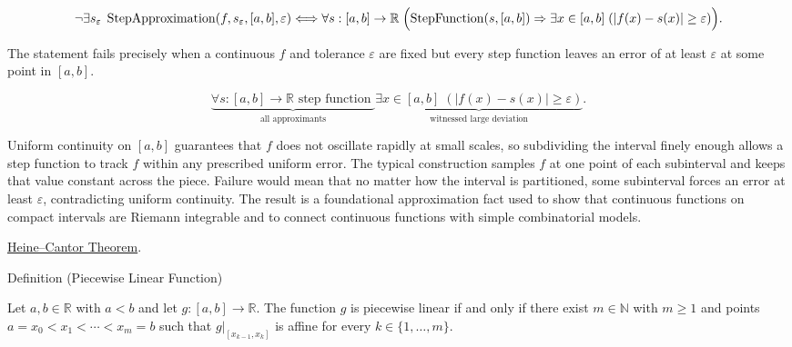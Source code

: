 \begin{remark*}
\[
\neg\exists s_\varepsilon\;
\operatorname{StepApproximation}(f,s_\varepsilon,[a,b],\varepsilon)
\Longleftrightarrow
\forall s:[a,b]\to\mathbb{R}\;
\Bigl(\operatorname{StepFunction}(s,[a,b]) \Rightarrow
\exists x\in[a,b]\;(|f(x)-s(x)|\ge\varepsilon)\Bigr).
\]
\end{remark*}

\begin{remark*}
The statement fails precisely when a continuous $f$ and tolerance $\varepsilon$ are fixed but every step function leaves an error of at least $\varepsilon$ at some point in $[a,b]$.
\end{remark*}

\begin{remark*}
\[
\underbrace{\forall s:[a,b]\to\mathbb{R} \text{ step function }}_{\text{all approximants}}
\underbrace{\exists x\in[a,b]\;(|f(x)-s(x)|\ge\varepsilon)}_{\text{witnessed large deviation}}.
\]
\end{remark*}

\begin{remark*}[Interpretation]
Uniform continuity on $[a,b]$ guarantees that $f$ does not oscillate rapidly at small scales, so subdividing the interval finely enough allows a step function to track $f$ within any prescribed uniform error. The typical construction samples $f$ at one point of each subinterval and keeps that value constant across the piece. Failure would mean that no matter how the interval is partitioned, some subinterval forces an error at least $\varepsilon$, contradicting uniform continuity. The result is a foundational approximation fact used to show that continuous functions on compact intervals are Riemann integrable and to connect continuous functions with simple combinatorial models.
\end{remark*}

\begin{dependencies}
\hyperref[thm:heine-cantor]{Heine--Cantor Theorem}.
\end{dependencies}


\begin{definitionbox}{Definition (Piecewise Linear Function)}
\begin{definition}
\label{def:piecewise-linear-function}
Let $a,b \in \mathbb{R}$ with $a<b$ and let $g:[a,b]\to\mathbb{R}$.
The function $g$ is piecewise linear if and only if there exist
$m \in \mathbb{N}$ with $m \ge 1$ and points
$a=x_0<x_1<\cdots<x_m=b$ such that $g|_{[x_{k-1},x_k]}$ is affine
for every $k\in\{1,\ldots,m\}$.
\end{definition}
\end{definitionbox}

